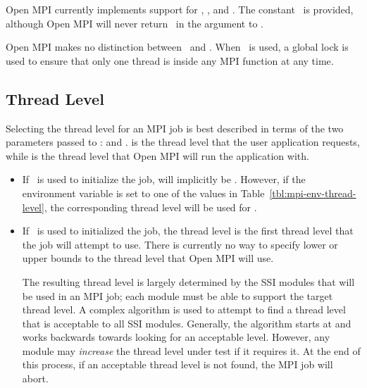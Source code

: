 Open MPI currently implements support for \mtsingle, \mtfunneled, and
\mtserial.  The constant \mtmultiple\ is provided, although Open MPI will
never return \mtmultiple\ in the  argument to
\mpiinitthread.

Open MPI makes no distinction between \mtsingle\ and \mtfunneled.  When
\mtserial\ is used, a global lock is used to ensure that only one
thread is inside any MPI function at any time.

\subsection{Thread Level}

Selecting the thread level for an MPI job is best described in terms
of the two parameters passed to \mpiinitthread: 
and .   is the thread level that
the user application requests, while  is the thread
level that Open MPI will run the application with.

\begin{itemize}
\item If \mpiinit\ is used to initialize the job, 
  will implicitly be \mtsingle.  However, if the
   environment variable is set
  to one of the values in Table~\ref{tbl:mpi-env-thread-level}, the
  corresponding thread level will be used for .
  
\item If \mpiinitthread\ is used to initialized the job, the
   thread level is the first thread level that the
  job will attempt to use.  There is currently no way to specify lower
  or upper bounds to the thread level that Open MPI will use.
  
  The resulting thread level is largely determined by the SSI modules
  that will be used in an MPI job; each module must be able to support
  the target thread level.  A complex algorithm is used to attempt to
  find a thread level that is acceptable to all SSI modules.
  Generally, the algorithm starts at  and works
  backwards towards  looking for an
  acceptable level.  However, any module may {\em increase} the thread
  level under test if it requires it.  At the end of this process, if
  an acceptable thread level is not found, the MPI job will abort.
\end{itemize}
  

